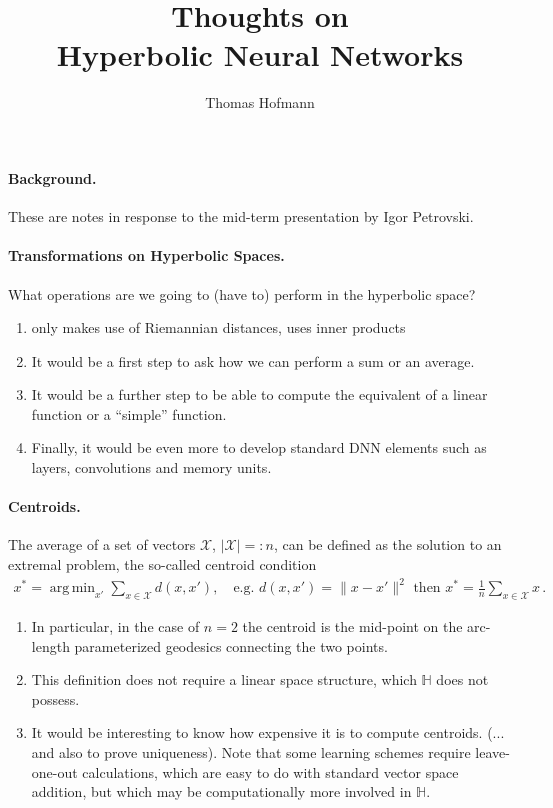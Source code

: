 \documentclass{article}
\title{
	{\large Thoughts on} \\[2mm]
	Hyperbolic Neural Networks
}
\author{Thomas Hofmann}
\DeclareMathOperator*{\argmin}{arg\,min}
\begin{document}
\maketitle 

\paragraph{Background.} These are notes in response to the mid-term presentation by Igor Petrovski.

\paragraph{Transformations on Hyperbolic Spaces.}  What operations are we going to (have to) perform in the hyperbolic space?
\begin{enumerate}
\item  \cite{nickel2017poincar} only makes use of Riemannian distances, \cite{chamberlain2017neural} uses inner products
\item It would be a first step to ask how we can perform a sum or an average. 
\item It would be a further step to be able to compute the equivalent of a linear function or a ``simple'' function. 
\item Finally, it would be even more to develop standard DNN elements such as layers, convolutions and memory units.
\end{enumerate}

\paragraph{Centroids.} The average of a set of vectors $\mathcal X$, $|\mathcal X|=:n$, can be defined as the solution to an extremal problem, the so-called centroid condition 
\begin{align}
x^* = \argmin_{x'} \sum_{x \in \mathcal X} d(x,x'), \quad \text{e.g.~$d(x,x') = \| x-x'\|^2$ then } x^* = \frac{1}{n} \sum_{x \in \mathcal X} x\,.
\end{align}
\begin{enumerate}
\item In particular, in the case of $n=2$ the centroid is the mid-point on the arc-length parameterized geodesics connecting the two points. 
\item This definition does not require a linear space structure, which $\mathbb H$ does not possess.
\item It would be interesting to know how expensive it is to compute centroids. (... and also to prove uniqueness). Note that some learning schemes require leave-one-out calculations, which are easy to do with standard vector space addition, but which may be computationally more involved in $\mathbb H$. 
\end{enumerate}
\end{document}
